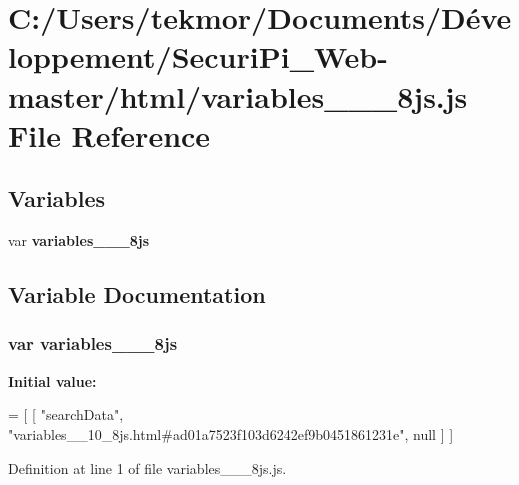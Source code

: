 \section{C\+:/\+Users/tekmor/\+Documents/\+Développement/\+Securi\+Pi\+\_\+\+Web-\/master/html/variables\+\_\+\+\_\+\_\+8js.js File Reference}
\label{variables____10__8js_8js}
\subsection*{Variables}
\begin{DoxyCompactItemize}
\item 
var {\bf variables\+\_\+\+\_\+\_\+8js}
\end{DoxyCompactItemize}


\subsection{Variable Documentation}
\subsubsection[{variables\+\_\+\+\_\+10\+\_\+8js}]{\setlength{\rightskip}{0pt plus 5cm}var variables\+\_\+\+\_\+\_\+8js}\label{variables____10__8js_8js_a3fc413f25d9a3dec9a77d6363d95fe67}
{\bfseries Initial value\+:}
\begin{DoxyCode}
=
[
    [ \textcolor{stringliteral}{"searchData"}, \textcolor{stringliteral}{"variables\_\_10\_8js.html#ad01a7523f103d6242ef9b0451861231e"}, null ]
]
\end{DoxyCode}


Definition at line 1 of file variables\+\_\+\+\_\+\_\+8js.\+js.

